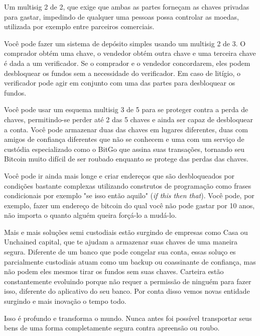 Um multisig 2 de 2, que exige que ambas as partes forneçam as chaves privadas para gastar, impedindo de qualquer uma pessoas possa controlar as moedas, utilizada por exemplo entre parceiros comerciais.



Você pode fazer um sistema de depósito simples usando um multisig 2 de 3. O comprador obtém uma chave, o vendedor obtém outra chave e uma terceira chave é dada a um verificador. Se o comprador e o vendedor concordarem, eles podem desbloquear os fundos sem a necessidade do verificador.
Em caso de litígio, o verificador pode agir em conjunto com uma das partes para desbloquear os fundos.

Você pode usar um esquema multisig 3 de 5 para se proteger contra a perda de chaves, permitindo-se perder até 2 das 5 chaves e ainda ser capaz de desbloquear a conta. Você pode armazenar duas das chaves em lugares diferentes, duas com amigos de confiança diferentes que não se conhecem e uma com um serviço de custódia especializado como o BitGo que assina suas transações, tornando seu Bitcoin muito difícil de ser roubado enquanto se protege das perdas das chaves.

Você pode ir ainda mais longe e criar endereços que são desbloqueados por condições bastante complexas utilizando construtos de programação como frases condicionais por exemplo "se isso então aquilo" (\textit{if this then that}).
Você pode, por exemplo, fazer um endereço de bitcoin do qual você não pode gastar por 10 anos, não importa o quanto alguém queira forçá-lo a mudá-lo.

Mais e mais soluções semi custodiais estão surgindo de empresas como Casa ou Unchained capital, que te ajudam a armazenar suas chaves de uma maneira segura. Diferente de um banco que pode congelar sua conta, essas soluço es parcialmente custodiais atuam como um backup ou coassinante de confiança, mas não podem eles mesmos tirar os fundos sem suas chaves.
Carteira estão constantemente evoluindo porque não requer a permissão de ninguém para fazer isso, diferente do aplicativo do seu banco. 
Por conta disso vemos novas entidade surgindo e mais inovação o tempo todo.

Isso é profundo e transforma o mundo. Nunca antes foi possível transportar seus bens de uma forma completamente segura contra apreensão ou roubo.